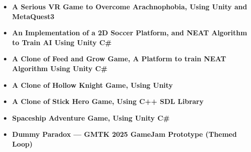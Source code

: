 \begin{cventries}
{  %
  \begin{itemize}
    \item \textbf{A Serious VR Game to Overcome Arachnophobia, Using Unity and MetaQuest3}
    \item \textbf{An Implementation of a 2D Soccer Platform, and NEAT Algorithm to Train AI Using Unity C\#}
    \item \textbf{A Clone of Feed and Grow Game, A Platform to train NEAT Algorithm Using Unity C\#}
    \item \textbf{A Clone of Hollow Knight Game, Using Unity}
    \item \textbf{A Clone of Stick Hero Game, Using C++ SDL Library}
    \item \textbf{Spaceship Adventure Game, Using Unity C\#}
    \item \textbf{Dummy Paradox — GMTK 2025 GameJam Prototype (Themed Loop)}
  \end{itemize}
  }
\end{cventries}
\vspace{0.5 cm}
